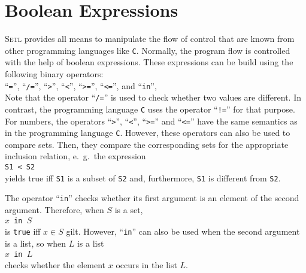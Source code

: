 \section{Boolean Expressions}
\textsc{Setl} provides all means to manipulate the flow of control that are known from
other programming languages like \texttt{C}.  Normally, the program flow is controlled
with the help of boolean expressions.  These expressions can be build using the following
binary operators:
\\[0.2cm]
\hspace*{1.3cm}
``\texttt{=}'',
``\texttt{/=}'',
``\texttt{>}'',
``\texttt{<}'',
``\texttt{>=}'',
``\texttt{<=}'', and
``\texttt{in}'',
\\[0.2cm]
Note that the operator ``\texttt{/=}'' is used to check whether two values are different.
In contrast, the programming language \texttt{C} uses the operator ``\texttt{!=}'' for
that purpose.  For numbers, the operators 
``\texttt{>}'',
``\texttt{<}'',
``\texttt{>=}'' and 
``\texttt{<=}''
have the same semantics as in the programming language \texttt{C}.  However, these
operators can also be used to compare sets.   Then, they compare the corresponding sets
for the appropriate inclusion relation, e.~g.~the expression 
\\[0.2cm]
\hspace*{1.3cm}
\texttt{S1 < S2}
\\[0.2cm]
yields true iff \texttt{S1} is a subset of \texttt{S2} and, furthermore, \texttt{S1} is
different from \texttt{S2}.

The operator ``\texttt{in}'' checks whether its first argument is an element of the second
argument.  Therefore, when $S$ is a set, 
\\[0.2cm]
\hspace*{1.3cm} \texttt{$x$ in $S$} 
\\[0.2cm]
is \texttt{true} iff $x \in S$ gilt.  However, ``\texttt{in}'' can also be used when the
second argument is a list, so when $L$ is a list 
\\[0.2cm]
\hspace*{1.3cm} \texttt{$x$ in $L$} 
\\[0.2cm]
checks whether the element $x$ occurs in the list $L$.

